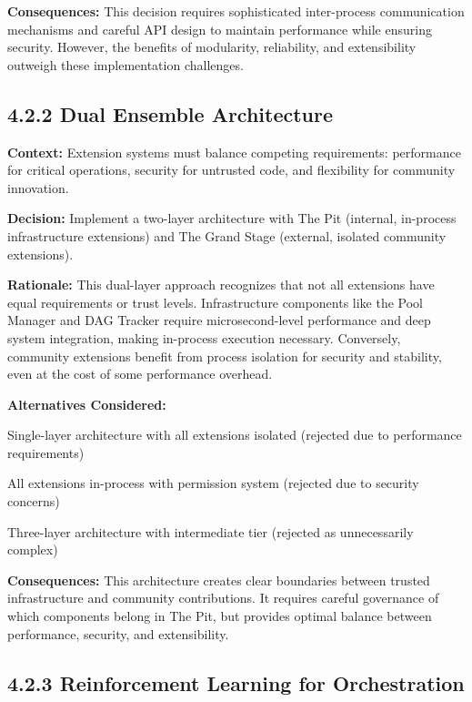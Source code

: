 \textbf{Consequences:} This decision requires sophisticated inter-process communication mechanisms and careful API design to maintain performance while ensuring security. However, the benefits of modularity, reliability, and extensibility outweigh these implementation challenges.

\subsection*{4.2.2 Dual Ensemble Architecture}

\textbf{Context:} Extension systems must balance competing requirements: performance for critical operations, security for untrusted code, and flexibility for community innovation.

\textbf{Decision:} Implement a two-layer architecture with The Pit (internal, in-process infrastructure extensions) and The Grand Stage (external, isolated community extensions).

\textbf{Rationale:} This dual-layer approach recognizes that not all extensions have equal requirements or trust levels. Infrastructure components like the Pool Manager and DAG Tracker require microsecond-level performance and deep system integration, making in-process execution necessary. Conversely, community extensions benefit from process isolation for security and stability, even at the cost of some performance overhead.

\textbf{Alternatives Considered:}
\begin{compactlist}
    \item Single-layer architecture with all extensions isolated (rejected due to performance requirements)
    \item All extensions in-process with permission system (rejected due to security concerns)
    \item Three-layer architecture with intermediate tier (rejected as unnecessarily complex)
\end{compactlist}

\textbf{Consequences:} This architecture creates clear boundaries between trusted infrastructure and community contributions. It requires careful governance of which components belong in The Pit, but provides optimal balance between performance, security, and extensibility.

\subsection*{4.2.3 Reinforcement Learning for Orchestration}

